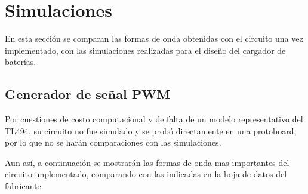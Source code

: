 \section{Simulaciones}


En esta sección se comparan las formas de onda obtenidas con el circuito una vez implementado, con las simulaciones realizadas para el diseño del cargador de baterías.

\subsection{Generador de señal PWM}

Por cuestiones de costo computacional y de falta de un modelo representativo del TL494,
su circuito no fue simulado y se probó directamente en una protoboard,
por lo que no se harán comparaciones con las simulaciones.

Aun así, a continuación se mostrarán las formas de onda mas importantes del circuito implementado,
comparando con las indicadas en la hoja de datos del fabricante.

